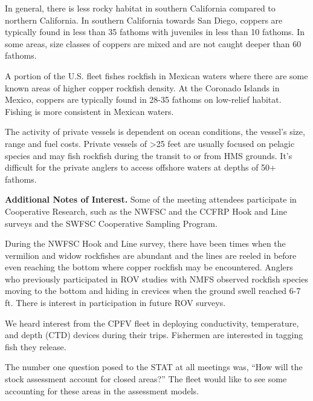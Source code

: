 \documentclass[11pt,
  english,
  letterpaper,
]{article}
\begin{document}
In general, there is less rocky habitat in southern California compared to northern California. In southern California towards San Diego, coppers are typically found in less than 35 fathoms with juveniles in less than 10 fathoms. In some areas, size classes of coppers are mixed and are not caught deeper than 60 fathoms.

A portion of the U.S. fleet fishes rockfish in Mexican waters where there are some known areas of higher copper rockfish density. At the Coronado Islands in Mexico, coppers are typically found in 28-35 fathoms on low-relief habitat. Fishing is more consistent in Mexican waters.

The activity of private vessels is dependent on ocean conditions, the vessel's size, range and fuel costs. Private vessels of \textgreater25 feet are usually focused on pelagic species and may fish rockfish during the transit to or from HMS grounds. It's difficult for the private anglers to access offshore waters at depths of 50+ fathoms.

\textbf{Additional Notes of Interest.} Some of the meeting attendees participate in Cooperative Research, such as the NWFSC and the CCFRP Hook and Line surveys and the SWFSC Cooperative Sampling Program.

During the NWFSC Hook and Line survey, there have been times when the vermilion and widow rockfishes are abundant and the lines are reeled in before even reaching the bottom where copper rockfish may be encountered. Anglers who previously participated in ROV studies with NMFS observed rockfish species moving to the bottom and hiding in crevices when the ground swell reached 6-7 ft. There is interest in participation in future ROV surveys.

We heard interest from the CPFV fleet in deploying conductivity, temperature, and depth (CTD) devices during their trips. Fishermen are interested in tagging fish they release.

The number one question posed to the STAT at all meetings was, ``How will the stock assessment account for closed areas?'' The fleet would like to see some accounting for these areas in the assessment models.
\end{document}
